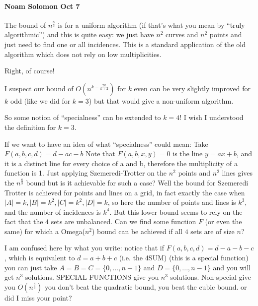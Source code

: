 \paragraph{Noam Solomon Oct 7}

\begin{displayquote}
The bound of $n^{\frac{8}{3}}$ is for a uniform algorithm (if that's what you
mean by ``truly algorithmic'') and this is quite easy:
we just have $n^2$ curves and $n^2$ points and just need to find one or
all incidences. This is a standard application of the old algorithm
which does not rely on low multiplicities.
\end{displayquote}

Right, of course!

\begin{displayquote}
I suspect our bound of
$O(n^{k - \frac{2k}{k+2}})$ for $k$ even can be very slightly improved for $k$ odd
(like we did for $k=3$) but that would give a non-uniform algorithm.
\end{displayquote}

\begin{displayquote}
So some notion of ``specialness'' can be extended to $k=4$! I wish I
understood the definition for $k=3$.
\end{displayquote}

\begin{displayquote}
If we want to have an idea of what ``specialness'' could mean:
Take $F(a,b,c,d) = d-ac-b$
Note that $F(a,b,x,y)=0$ is the line $y=ax+b$, and it is a distinct line
for every choice of a and b, therefore the multiplicity of a function
is 1. Just applying Szemeredi-Trotter on the $n^2$ points and $n^2$ lines
gives the $n^{\frac{8}{3}}$ bound but is it achievable for such a case? Well the
bound for Szemeredi Trotter is achieved for points and lines on a
grid, in fact exactly the case when
$|A|=k, |B|=k^2, |C|=k^2, |D|=k$, so here the number of points and lines
is $k^3$, and the number of incidences is $k^4$.
But this lower bound seems to rely on the fact that the $4$ sets are
unbalanced. Can we find some function $F$ (or even the same) for which a
Omega($n^2$) bound can be achieved if all $4$ sets are of size $n$?
\end{displayquote}

I am confused here by what you write: notice that if
$F(a,b,c,d)=d-a-b-c$,
which is equivalent to $d=a+b+c$ (i.e. the 4SUM) (this is a special
function) you can just take $A=B=C=\{0,...,n-1\}$ and $D=\{0,...,n-1\}$ and you
will get $n^3$ solutions. SPECIAL FUNCTIONS give you $n^3$ solutions.
Non-special give you $O(n^{\frac{8}{3}})$ you don't beat the quadratic bound,
you beat the cubic bound. or did I miss your point?

